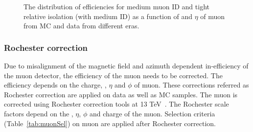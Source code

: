 \begin{figure}
    \caption{ The distribution of efficiencies for medium muon ID and tight relative
    isolation (with medium ID) as a function of \pt and $\eta$ of muon from MC and data
    from different eras.}
    \label{fig:muonIsoIDEff}
\end{figure}

\subsubsection{Rochester correction}
Due to misalignment of the magnetic field and azimuth dependent in-efficiency of 
the muon detector, the efficiency of the muon needs to be corrected. The efficiency
depends on the charge, \pt, $\eta$ and $\phi$ of muon. These corrections referred as 
Rochester correction are applied on data as well as MC samples. The muon \pt is
corrected using Rochester correction tools at 13 TeV~\cite{Bodek:2012id}.
The Rochester scale factors depend on the \pt, $\eta$, $\phi$ and charge of the 
muon. Selection criteria (Table~\ref{tab:muonSel}) on muon are applied after 
Rochester correction.


